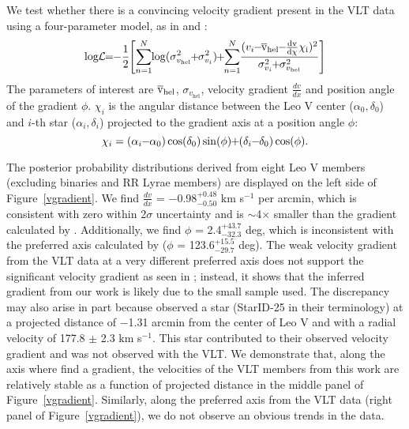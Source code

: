 \documentclass[twocolumn]{aastex63}
\begin{document}
We test whether there is a convincing velocity gradient present in the VLT data using a four-parameter model, as in \citet{col2017} and \citet{li2017}: 
\begin{equation}\label{eq:mcmc_gradient}
\medmuskip=-1.5mu
\thinmuskip=-1mu
\thickmuskip=-1mu
\log \mathcal{L} = -\frac{1}{2} \left [  \sum_{n = 1}^{N}\log (\sigma_{v_{\rm hel}}^2 + \sigma_{v_i}^2) +  \sum_{n = 1}^{N} \frac{(v_i - \rm\overline{v}_{hel} - \frac{dv}{d\chi}\chi_i)^2}{\sigma_{v_i}^2 + \sigma_{v_{\rm hel}}^2} \right ]
\end{equation}
The parameters of interest are $\rm\overline{v}_{hel}$, $\sigma_{v_\mathrm{hel}}$, velocity gradient $\frac{dv}{dx}$ and position angle of the gradient $\phi$. $\chi_i$ is the angular distance between the Leo V center ($\alpha_0, \delta_0$) and $i$-th star ($\alpha_i, \delta_i$) projected to the gradient axis at a position angle $\phi$:
\begin{equation}\label{eq:mcmc_chi}
\medmuskip=-1mu
\chi_i = (\alpha_i - \alpha_0)\cos(\delta_0)\sin(\phi) + (\delta_i - \delta_0)\cos(\phi).
\end{equation}

The posterior probability distributions derived from eight Leo V members (excluding binaries and RR Lyrae members) are displayed on the left side of Figure~\ref{vgradient}. We find $\frac{dv}{dx}$ = $-$0.98$^{+0.48}_{-0.50}$ km s$^{-1}$ per arcmin, which is consistent with zero within 2$\sigma$ uncertainty and is $\sim$4$\times$ smaller than the gradient calculated by \citet{col2017}. Additionally, we find $\phi$ = 2.4$^{+43.7}_{-32.3}$ deg, which is inconsistent with the preferred axis calculated by \citet{col2017} ($\phi$ = 123.6$^{+15.5}_{-29.7}$ deg). The weak velocity gradient from the VLT data at a very different preferred axis does not support the significant velocity gradient as seen in \citet{col2017}; instead, it shows that the inferred gradient from our work is likely due to the small sample used.
The discrepancy may also arise in part because \citet{col2017} observed a star (StarID-25 in their terminology) at a projected distance of $-$1.31 arcmin from the center of Leo V and with a radial velocity of 177.8 $\pm$ 2.3 km s$^{-1}$. This star contributed to their observed velocity gradient and was not observed with the VLT.
We demonstrate that, along the axis where \citet{col2017} find a gradient, the velocities of the VLT members from this work are relatively stable as a function of projected distance in the middle panel of Figure~\ref{vgradient}. Similarly, along the preferred axis from the VLT data (right panel of Figure~\ref{vgradient}), we do not observe an obvious trends in the \citet{col2017} data. 
\end{document}
